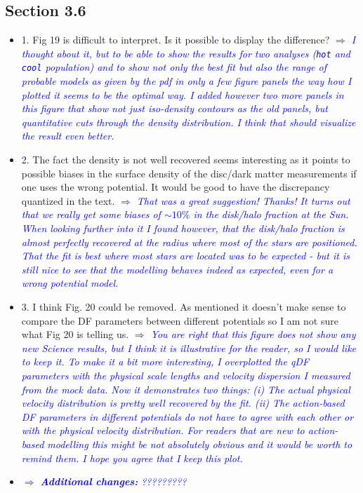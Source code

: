 \documentclass[10pt,a4paper]{article}
\newcommand{\Comment}[1]{\textsl{\textcolor{Blue}{$\Longrightarrow$ {#1}}}}
\begin{document}
\subsection{Section 3.6}
\begin{itemize}
\item 1. Fig 19 is difficult to interpret. Is it possible to display the difference? \Comment{I thought about it, but to be able to show the results for two analyses (\texttt{hot} and \texttt{cool} population) and to show not only the best fit but also the range of probable models as given by the pdf in only a few figure panels the way how I plotted it seems to be the optimal way. I added however two more panels in this figure that show not just iso-density contours as the old panels, but quantitative cuts through the density distribution. I think that should visualize the result even better.} 
\item 2. The fact the density is not well recovered seems interesting as it points to possible biases in the surface density of the disc/dark matter measurements if one uses the wrong potential. It would be good to have the discrepancy quantized in the text. \Comment{That was a great suggestion! Thanks! It turns out that we really get some biases of $\sim10\%$ in the disk/halo fraction at the Sun. When looking further into it I found however, that the disk/halo fraction is almost perfectly recovered at the radius where most of the stars are positioned. That the fit is best where most stars are located was to be expected - but it is still nice to see that the modelling behaves indeed as expected, even for a wrong potential model.}
\item 3. I think Fig. 20 could be removed. As mentioned it doesn't make sense to compare the DF parameters between different potentials so I am not sure what Fig 20 is telling us. \Comment{You are right that this figure does not show any new Science results, but I think it is illustrative for the reader, so I would like to keep it. To make it a bit more interesting, I overplotted the qDF parameters with the physical scale lengths and velocity dispersion I measured from the mock data. Now it demonstrates two things: (i) The actual physical velocity distribution is pretty well recovered by the fit. (ii) The action-based DF parameters in different potentials do not have to agree with each other or with the physical velocity distribution. For readers that are new to action-based modelling this might be not absolutely obvious and it would be worth to remind them. I hope you agree that I keep this plot.}
\item \Comment{\textbf{Additional changes:} ?????????}
\end{itemize}
\end{document}

